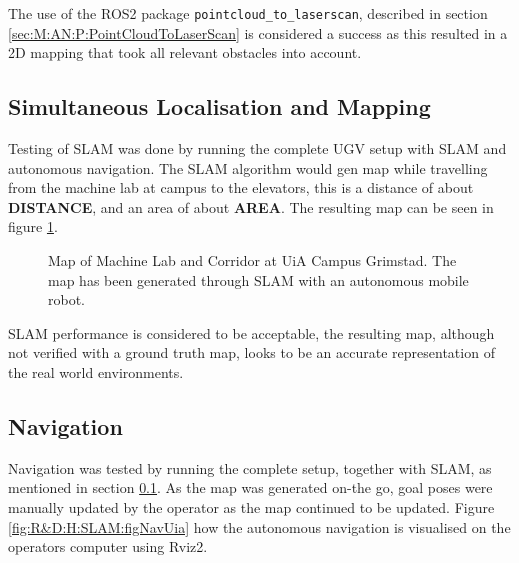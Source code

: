 The use of the ROS2 package \lstinline{pointcloud_to_laserscan}, described in section \ref{sec:M:AN:P:PointCloudToLaserScan} is considered a success as this resulted in a 2D mapping that took all relevant obstacles into account.

\subsection{Simultaneous Localisation and Mapping}\label{sec:R&D:AN:SLAM}
Testing of SLAM was done by running the complete UGV setup with SLAM and autonomous navigation. The SLAM algorithm would gen  map while travelling from the machine lab at campus to the elevators, this is a distance of about \textbf{DISTANCE}, and an area of about \textbf{AREA}. The resulting map can be seen in figure \ref{fig:R&D:AN:SLAM:figUiaMap}.

\begin{figure}[ht]
  \centering
  
  \caption{Map of Machine Lab and Corridor at UiA Campus Grimstad. The map has been generated through SLAM with an autonomous mobile robot.}
  \label{fig:R&D:AN:SLAM:figUiaMap}
\end{figure}

SLAM performance is considered to be acceptable, the resulting map, although not verified with a ground truth map, looks to be an accurate representation of the real world environments. 

\subsection{Navigation}\label{sec:R&D:AN:Navigation}
Navigation was tested by running the complete setup, together with SLAM, as mentioned in section \ref{sec:R&D:AN:SLAM}. As the map was generated on-the go, goal poses were manually updated by the operator as the map continued to be updated. Figure \ref{fig:R&D:H:SLAM:figNavUia} how the autonomous navigation is visualised on the operators computer using Rviz2.

